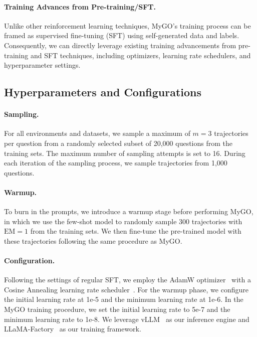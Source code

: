 \paragraph{Training Advances from Pre-training/SFT.}
Unlike other reinforcement learning techniques, MyGO's training process can be framed as supervised fine-tuning (SFT) using self-generated data and labels. Consequently, we can directly leverage existing training advancements from pre-training and SFT techniques, including optimizers, learning rate schedulers, and hyperparameter settings.




\subsection{Hyperparameters and Configurations}

\paragraph{Sampling.}
For all environments and datasets, we sample a maximum of $m=3$ trajectories per question from a randomly selected subset of 20,000 questions from the training sets. The maximum number of sampling attempts is set to 16. During each iteration of the sampling process, we sample trajectories from 1,000 questions.


\paragraph{Warmup.}
To burn in the prompts, we introduce a warmup stage before performing MyGO, in which we use the few-shot model to randomly sample 300 trajectories with $\text{EM}=1$ from the training sets. We then fine-tune the pre-trained model with these trajectories following the same procedure as MyGO.

\paragraph{Configuration.}

Following the settings of regular SFT, we employ the AdamW optimizer~\cite{loshchilov2019decoupled} with a Cosine Annealing learning rate scheduler~\cite{loshchilov2017sgdr}. For the warmup phase, we configure the initial learning rate at 1e-5 and the minimum learning rate at 1e-6. In the MyGO training procedure, we set the initial learning rate to 5e-7 and the minimum learning rate to 1e-8.
We leverage vLLM~\cite{kwon2023efficient} as our inference engine and LLaMA-Factory~\cite{zheng2024llamafactory} as our training framework.




